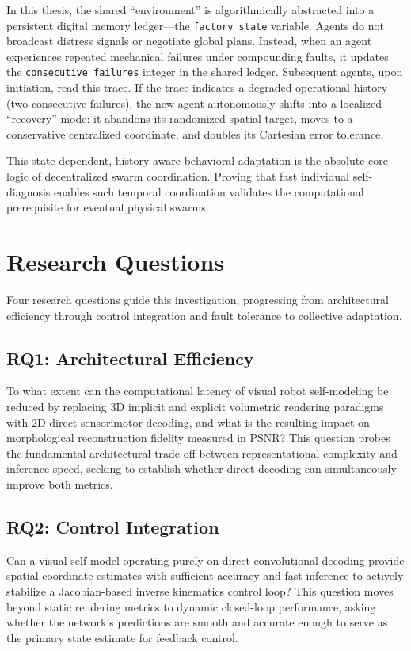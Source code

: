 \documentclass[12pt,a4paper,oneside]{report}
\begin{document}
In this thesis, the shared ``environment'' is algorithmically abstracted into a persistent digital memory ledger—the \texttt{factory\_state} variable. Agents do not broadcast distress signals or negotiate global plans. Instead, when an agent experiences repeated mechanical failures under compounding faults, it updates the \texttt{consecutive\_failures} integer in the shared ledger. Subsequent agents, upon initiation, read this trace. If the trace indicates a degraded operational history (two consecutive failures), the new agent autonomously shifts into a localized ``recovery'' mode: it abandons its randomized spatial target, moves to a conservative centralized coordinate, and doubles its Cartesian error tolerance.

This state-dependent, history-aware behavioral adaptation is the absolute core logic of decentralized swarm coordination. Proving that fast individual self-diagnosis enables such temporal coordination validates the computational prerequisite for eventual physical swarms.

\section{Research Questions}
\label{sec:research_questions}

Four research questions guide this investigation, progressing from architectural efficiency through control integration and fault tolerance to collective adaptation.

\subsection{RQ1: Architectural Efficiency}
\label{subsec:RQ1}

To what extent can the computational latency of visual robot self-modeling be reduced by replacing 3D implicit and explicit volumetric rendering paradigms with 2D direct sensorimotor decoding, and what is the resulting impact on morphological reconstruction fidelity measured in PSNR? This question probes the fundamental architectural trade-off between representational complexity and inference speed, seeking to establish whether direct decoding can simultaneously improve both metrics.

\subsection{RQ2: Control Integration}
\label{subsec:RQ2}

Can a visual self-model operating purely on direct convolutional decoding provide spatial coordinate estimates with sufficient accuracy and fast inference to actively stabilize a Jacobian-based inverse kinematics control loop? This question moves beyond static rendering metrics to dynamic closed-loop performance, asking whether the network's predictions are smooth and accurate enough to serve as the primary state estimate for feedback control.
\end{document}
